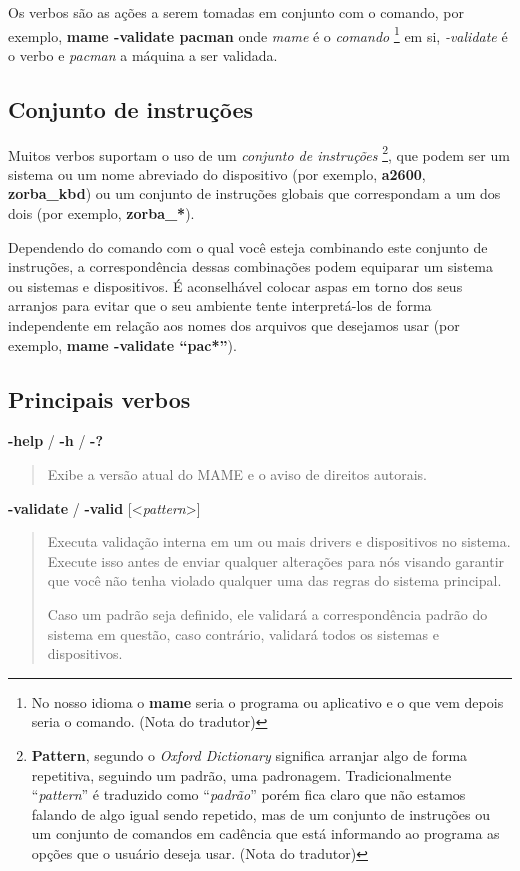 \documentclass[letterpaper,10pt,brazil]{sphinxmanual}
\begin{document}
Os verbos são as ações a serem tomadas em conjunto com o comando, por
exemplo, \textbf{mame -validate pacman} onde \emph{mame} é o \emph{comando} \footnote[1]{\sphinxAtStartFootnote%
No nosso idioma o \textbf{mame} seria o programa ou aplicativo e o
que vem depois seria o comando. (Nota do tradutor)
} em si,
\emph{-validate} é o verbo e \emph{pacman} a máquina a ser validada.


\subsection{Conjunto de instruções}
\label{commandline/commandline-all:conjunto-de-instrucoes}
Muitos verbos suportam o uso de um \emph{conjunto de instruções} \footnote[2]{\sphinxAtStartFootnote%
\textbf{Pattern}, segundo o \emph{Oxford Dictionary} significa arranjar
algo de forma repetitiva, seguindo um padrão, uma padronagem.
Tradicionalmente ``\emph{pattern}'' é traduzido como ``\emph{padrão}'' porém
fica claro que não estamos falando de algo igual sendo repetido,
mas de um conjunto de instruções ou um conjunto de comandos em
cadência que está informando ao programa as opções que o usuário
deseja usar. (Nota do tradutor)
}, que
podem ser um sistema ou um nome abreviado do dispositivo (por exemplo,
\textbf{a2600}, \textbf{zorba\_kbd}) ou um conjunto de instruções globais que
correspondam a um dos dois (por exemplo, \textbf{zorba\_*}).

Dependendo do comando com o qual você esteja combinando este conjunto de
instruções, a correspondência dessas combinações podem equiparar um
sistema ou sistemas e dispositivos. É aconselhável colocar aspas em
torno dos seus arranjos para evitar que o seu ambiente tente
interpretá-los de forma independente em relação aos nomes dos arquivos
que desejamos usar (por exemplo, \textbf{mame -validate ``pac*''}).


\subsection{Principais verbos}
\label{commandline/commandline-all:principais-verbos}\label{commandline/commandline-all:mame-commandline-help}
\textbf{-help} / \textbf{-h} / \textbf{-?}
\begin{quote}

Exibe a versão atual do MAME e o aviso de direitos autorais.
\end{quote}
\label{commandline/commandline-all:mame-commandline-validate}
\textbf{-validate} / \textbf{-valid} {[}\textless{}\emph{pattern}\textgreater{}{]}
\begin{quote}

Executa validação interna em um ou mais drivers e dispositivos
no sistema. Execute isso antes de enviar qualquer alterações para
nós visando garantir que você não tenha violado qualquer uma das
regras do sistema principal.

Caso um padrão seja definido, ele validará a correspondência padrão
do sistema em questão, caso contrário, validará todos os sistemas e
dispositivos.
\end{quote}
\end{document}
